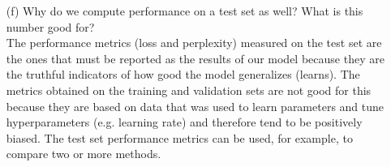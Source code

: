 \documentclass{article}
\begin{document}
\begin{itemize}
    \item[(f)] Why do we compute performance on a test set as well? What is this number good for?\\
    The performance metrics (loss and perplexity) measured on the test set are the ones that must be reported as the results of our model because they are the truthful indicators of how good the model generalizes (learns). The metrics obtained on the training and validation sets are not good for this because they are based on data that was used to learn parameters and tune hyperparameters (e.g. learning rate) and therefore tend to be positively biased. The test set performance metrics can be used, for example, to compare two or more methods.
\end{itemize}
\end{document}
